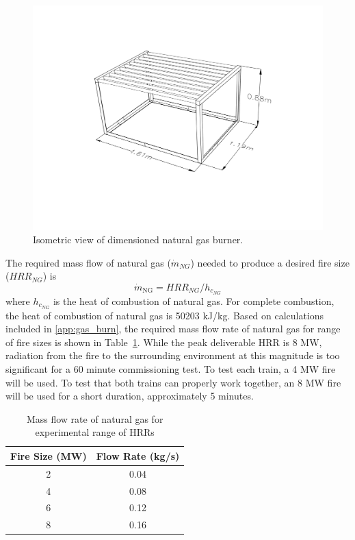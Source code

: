 \documentclass[12pt,oneside]{book}
\begin{document}
\begin{figure}
\centering
\includegraphics[width=.8\textwidth]{../Figures/Natural_Gas_Burner}
\caption {Isometric view of dimensioned natural gas burner.}
\label{fig:nat_gas_burn}
\end{figure}

The required mass flow of natural gas ($\dot{m}_{NG}$) needed to produce a desired fire size ($HRR_{NG}$) is
\begin{equation}
\dot{m}_{\mathrm{NG}} = HRR_{NG}/h_{c_{NG}}
\end{equation}
where $h_{c_{NG}}$ is the heat of combustion of natural gas. For complete combustion, the heat of combustion of natural gas is 50203 kJ/kg. Based on calculations included in \ref{app:gas_burn}, the required mass flow rate of natural gas for range of fire sizes is shown in Table~\ref{tab:ng_flow}. While the peak deliverable HRR is 8 MW, radiation from the fire to the surrounding environment at this magnitude is too significant for a 60 minute commissioning test. To test each train, a 4 MW fire will be used. To test that both trains can properly work together, an 8 MW fire will be used for a short duration, approximately 5 minutes. 

\begin{table}
\centering
\caption{Mass flow rate of natural gas for experimental range of HRRs}
\label{tab:ng_flow}
\begin{tabular}{cc}
\toprule[1.5pt]
Fire Size (MW) & Flow Rate (kg/s)  \\
\midrule
2  &  0.04 \\
4  &  0.08 \\
6  &  0.12 \\
8  &  0.16 \\
\bottomrule[1.25pt]
\end{tabular}\par
\end{table}
\end{document}
